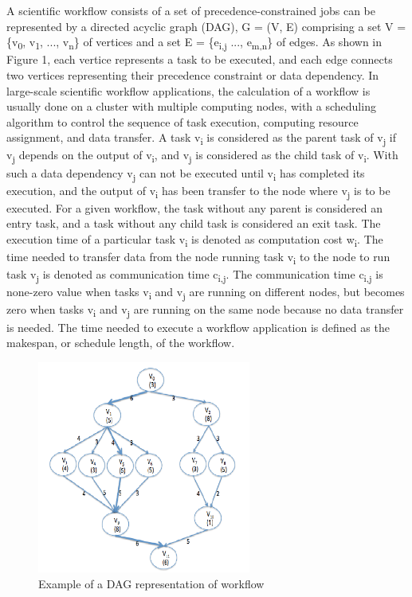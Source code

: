 A scientific workflow consists of a set of precedence-constrained jobs can be represented by a directed acyclic graph (DAG), G = (V, E) comprising a set V = \{v\textsubscript{0}, v\textsubscript{1}, ..., v\textsubscript{n}\} of vertices and a set E = \{e\textsubscript{i,j} ..., e\textsubscript{m,n}\} of edges. As shown in Figure 1, each vertice represents a task to be executed, and each edge connects two vertices representing their precedence constraint or data dependency. In large-scale scientific workflow applications, the calculation of a workflow is usually done on a cluster with multiple computing nodes, with a scheduling algorithm to control the sequence of task execution, computing resource assignment, and data transfer. A task v\textsubscript{i} is considered as the parent task of v\textsubscript{j} if v\textsubscript{j} depends on the output of v\textsubscript{i}, and v\textsubscript{j} is considered as the child task of v\textsubscript{i}. With such a data dependency v\textsubscript{j} can not be executed until v\textsubscript{i} has completed its execution, and the output of v\textsubscript{i} has been transfer to the node where v\textsubscript{j} is to be executed. For a given workflow, the task without any parent is considered an entry task, and a task without any child task is considered an exit task. The execution time of a particular task v\textsubscript{i} is denoted as computation cost w\textsubscript{i}. The time needed to transfer data from the node running task v\textsubscript{i} to the node to run task v\textsubscript{j} is denoted as communication time c\textsubscript{i,j}. The communication time c\textsubscript{i,j} is none-zero value when tasks v\textsubscript{i} and v\textsubscript{j} are running on different nodes, but becomes zero when tasks v\textsubscript{i} and v\textsubscript{j} are running on the same node because no data transfer is needed. The time needed to execute a workflow application is defined as the makespan, or schedule length, of the workflow. 
 
\begin{figure}[!t]
	\centering
	\hspace{-5pt}
	\includegraphics[width=7cm]{dag_example}
    \vspace{5pt}
	\caption{Example of a DAG representation of workflow}
	\label{fig:dag_example}
\end{figure} 


